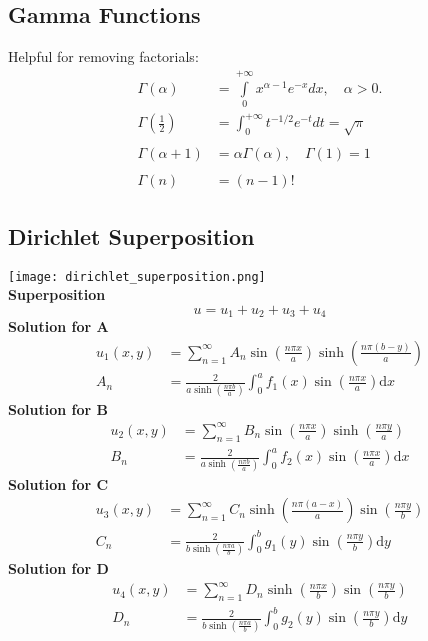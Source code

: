 \subsection{Gamma Functions}
Helpful for removing factorials:
\begin{align*}
    \Gamma(\alpha)             & =\int\limits_{0}^{+\infty}x^{\alpha-1}e^{-x}dx,\quad\alpha>0. \\
    \Gamma\left(\frac12\right) & =\int_0^{+\infty}t^{-1/2}e^{-t}dt=\sqrt{\pi}                  \\ \\
    \Gamma(\alpha+1)           & =\alpha\Gamma(\alpha),\quad \Gamma(1)=1                       \\ \\
    \Gamma(n)                  & =(n-1)!
\end{align*}

\subsection{Dirichlet Superposition}\label{diri_superpos}
\texttt{[image: dirichlet\_superposition.png]}\\
\textbf{Superposition}
\begin{equation*}
    u = u_1+u_2+u_3+u_4
\end{equation*}
\textbf{Solution for A}
\begin{align*}
    u_1(x,y) & =\sum_{n=1}^\infty A_n\sin\left(\frac{n\pi x}a\right)\sinh\left(\frac{n\pi(b-y)}a\right)             \\
    A_n      & =\frac2{a\sinh\left(\frac{n\pi b}a\right)}\int_0^{a}f_1(x)\sin\left(\frac{n\pi x}a\right)\mathrm{d}x
\end{align*}
\textbf{Solution for B}
\begin{align*}
    u_2(x,y) & =\sum_{n=1}^\infty B_n\sin\left(\frac{n\pi x}a\right)\sinh\left(\frac{n\pi y}a\right)                \\
    B_n      & =\frac2{a\sinh\left(\frac{n\pi b}a\right)}\int_0^{a}f_2(x)\sin\left(\frac{n\pi x}a\right)\mathrm{d}x
\end{align*}
\textbf{Solution for C}
\begin{align*}
    u_3(x,y) & =\sum_{n=1}^\infty C_n\sinh\left(\frac{n\pi(a-x)}a\right)\sin\left(\frac{n\pi y}b\right)             \\
    C_n      & =\frac2{b\sinh\left(\frac{n\pi a}b\right)}\int_0^{b}g_1(y)\sin\left(\frac{n\pi y}b\right)\mathrm{d}y
\end{align*}
\textbf{Solution for D}
\begin{align*}
    u_4(x,y) & =\sum_{n=1}^\infty D_n\sinh\left(\frac{n\pi x}b\right)\sin\left(\frac{n\pi y}b\right)                \\
    D_n      & =\frac2{b\sinh\left(\frac{n\pi a}b\right)}\int_0^{b}g_2(y)\sin\left(\frac{n\pi y}b\right)\mathrm{d}y
\end{align*}

